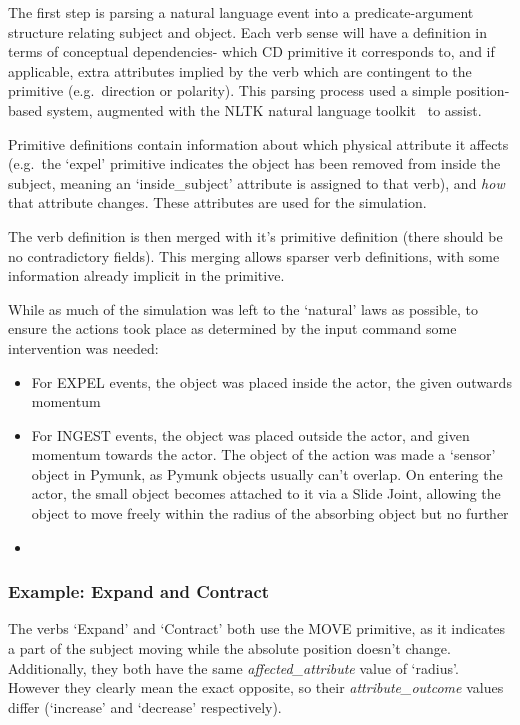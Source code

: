 \documentclass[dissertation.tex]{subfiles}
\begin{document}
    The first step is parsing a natural language event into a predicate-argument structure relating subject and object. Each verb sense will have a definition in terms of conceptual dependencies- which CD primitive it corresponds to, and if applicable, extra attributes implied by the verb which are contingent to the primitive (e.g.~direction or polarity). This parsing process used a simple position-based system, augmented with the NLTK natural language toolkit~\cite{bird2009nltk} to assist.
    
    Primitive definitions contain information about which physical attribute it affects (e.g.~the `expel' primitive indicates the object has been removed from inside the subject, meaning an `inside\_subject' attribute is assigned to that verb), and \emph{how} that attribute changes. These attributes are used for the simulation.
    
    The verb definition is then merged with it's primitive definition (there should be no contradictory fields). This merging allows sparser verb definitions, with some information already implicit in the primitive.

    While as much of the simulation was left to the `natural' laws as possible, to ensure the actions took place as determined by the input command some intervention was needed:

    \begin{itemize}
        \item For EXPEL events, the object was placed inside the actor, the given outwards momentum
        \item For INGEST events, the object was placed outside the actor, and given momentum towards the actor. The object of the action was made a `sensor' object in Pymunk, as Pymunk objects usually can't overlap. On entering the actor, the small object becomes attached to it via a Slide Joint, allowing the object to move freely within the radius of the absorbing object but no further
        \item 
    \end{itemize}

    \subsubsection{Example: Expand and Contract}
    The verbs `Expand' and `Contract' both use the MOVE primitive, as it indicates a part of the subject moving while the absolute position doesn't change. Additionally, they both have the same \emph{affected\_attribute} value of `radius'. However they clearly mean the exact opposite, so their \emph{attribute\_outcome} values differ (`increase' and `decrease' respectively).
\end{document}
